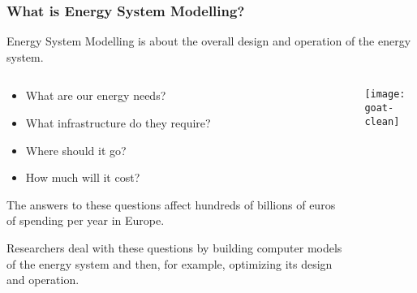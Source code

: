 \documentclass[10pt,aspectratio=169,dvipsnames]{beamer}
\let\olditem\item
\renewcommand{\item}{%
\olditem\vspace{5pt}}
\begin{document}
\begin{frame}
  \frametitle{What is Energy System Modelling?}

  \alert{Energy System Modelling} is about the overall \alert{design} and \alert{operation} of the energy system.


\begin{columns}[T]
  \begin{column}{8cm}

    \vspace{.1cm}
    \begin{itemize}
      \item What are our \alert{energy needs}?
  \item What \alert{infrastructure} do they
    require?
  \item \alert{Where} should it go?
  \item How much will it \alert{cost}?
  \end{itemize}

  \hspace{0.2cm}

  The answers to these questions affect \alert{hundreds of billions}
  of euros of spending per year in Europe.

  \hspace{0.3cm}

  Researchers deal with these questions by \alert{building computer models}
  of the energy system and then, for example, \alert{optimizing}
  its design and operation.

  \end{column}
  \begin{column}{5.5cm}
    \vspace{.2cm}
  \texttt{[image: goat-clean]}
  \end{column}
\end{columns}
\end{frame}
\end{document}
